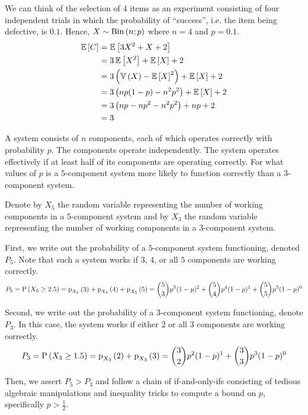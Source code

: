 \documentclass[11pt]{article}
\begin{document}
\begin{solution}
    We can think of the selection of $4$ items as an experiment consisting of
    four independent trials in which the probability of ``success'', i.e. the
    item being defective, is $0.1$. Hence, $X \sim \operatorname{Bin}\left(n;p\right)$ where $n = 4$ and
    $p = 0.1$.
    \begin{align*}
        \operatorname{\mathbb{E}}{\left[C\right]}
        &= \operatorname{\mathbb{E}}{\left[3 X^2 + X + 2\right]} \\
        &= 3 \operatorname{\mathbb{E}}{\left[X^2\right]} + \operatorname{\mathbb{E}}{\left[X\right]} + 2 \\
        &= 3 \left(\operatorname{\mathbb{V}}{\left(X\right)} - \operatorname{\mathbb{E}}{\left[X\right]}^2\right) + \operatorname{\mathbb{E}}{\left[X\right]} + 2 \\
        &= 3 \left(np(1-p) - n^2 p^2\right) + \operatorname{\mathbb{E}}{\left[X\right]} + 2 \\
        &= 3 \left(np - np^2 - n^2 p^2\right) + np + 2 \\
        &= 3
    \end{align*}
\end{solution}

\begin{eg}
    A system consists of $n$ components, each of which operates correctly with
    probability $p$. The components operate independently. The system operates
    effectively if at least half of its components are operating correctly.
    For what values of $p$ is a $5$-component system more likely to function
    correctly than a $3$-component system.
\end{eg}

\begin{solution}
    Denote by $X_5$ the random variable representing the number of working
    components in a $5$-component system and by $X_3$ the random variable
    representing the number of working components in a $3$-component system.

    First, we write out the probability of a $5$-component system functioning,
    denoted $P_5$. Note that such a system works if $3$, $4$, or all $5$
    components are working correctly.
    \begin{equation*}
        P_5
        = \P{X_5 \geq 2.5}
        = \p[X_5]{3} + \p[X_5]{4} + \p[X_5]{5}
        = \binom{5}{3} p^3 (1-p)^2
            + \binom{5}{4} p^4 (1-p)^1
            + \binom{5}{5} p^5 (1-p)^0
    \end{equation*}

    Second, we write out the probability of a $3$-component system functioning,
    denote $P_3$. In this case, the system works if either $2$ or all $3$
    components are working correctly.
    \begin{equation*}
        P_3
        = \P{X_3 \geq 1.5}
        = \p[X_3]{2} + \p[X_3]{3}
        = \binom{3}{2} p^2 (1-p)^1 + \binom{3}{3} p^3 (1-p)^0
    \end{equation*}

    Then, we assert $P_5 > P_3$ and follow a chain of if-and-only-ifs
    consisting of tedious algebraic manipulations and inequality tricks to
    compute a bound on $p$, specifically $p > \frac{1}{2}$.
\end{solution}
\end{document}
